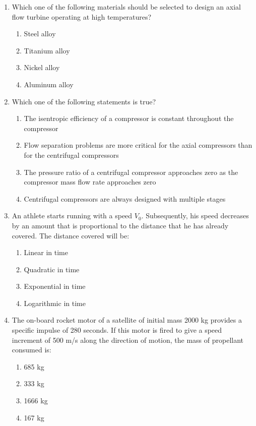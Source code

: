 \documentclass[journal]{IEEEtran}
\numberwithin{equation}{enumi}
\numberwithin{figure}{enumi}
\begin{document}
\begin{enumerate}[start=35]
    \item Which one of the following materials should be selected to design an axial flow turbine operating at high temperatures?
    \begin{enumerate}
        \item Steel alloy
        \item Titanium alloy
        \item Nickel alloy
        \item Aluminum alloy
    \end{enumerate}

    \item Which one of the following statements is true?
    \begin{enumerate}
        \item The isentropic efficiency of a compressor is constant throughout the compressor
        \item Flow separation problems are more critical for the axial compressors than for the centrifugal compressors
        \item The pressure ratio of a centrifugal compressor approaches zero as the compressor mass flow rate approaches zero
        \item Centrifugal compressors are always designed with multiple stages
    \end{enumerate}

    \item An athlete starts running with a speed $V_0$. Subsequently, his speed decreases by an amount that is proportional to the distance that he has already covered. The distance covered will be:
    \begin{enumerate}
        \item Linear in time
        \item Quadratic in time
        \item Exponential in time
        \item Logarithmic in time
    \end{enumerate}

    \item The on-board rocket motor of a satellite of initial mass 2000 kg provides a specific impulse of 280 seconds. If this motor is fired to give a speed increment of 500 m/s along the direction of motion, the mass of propellant consumed is:
    \begin{enumerate}
        \item 685 kg
        \item 333 kg
        \item 1666 kg
        \item 167 kg
    \end{enumerate}
\end{enumerate}
\end{document}
